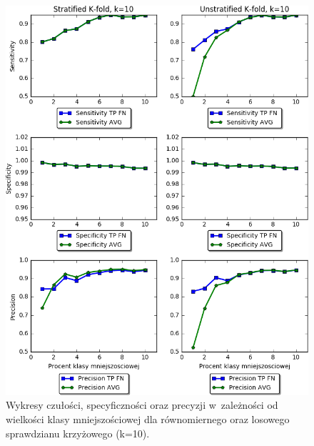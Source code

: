 \begin{figure}[H]
	\centering
	\includegraphics[width=\textwidth]{./images/wsk.png}
	\caption[Wykresy miar dla sprawdzianu krzyżowego]{Wykresy czułości, specyficzności oraz precyzji w~zależności od wielkości klasy mniejszościowej dla równomiernego oraz losowego sprawdzianu krzyżowego (k=10).}
	\label{fig:wskazniki}
\end{figure}

